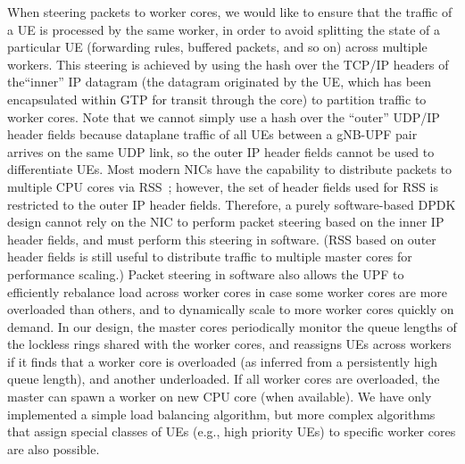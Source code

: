 When steering packets to worker cores, we would like to ensure that the traffic of a UE is processed by the same worker, in order to avoid splitting the state of a particular UE (forwarding rules, buffered packets, and so on) across multiple workers. This steering is achieved by using the hash over the TCP/IP headers of the``inner'' IP datagram (the datagram originated by the UE, which has been encapsulated within GTP for transit through the core) to partition traffic to worker cores. Note that we cannot simply use a hash over the ``outer'' UDP/IP header fields because dataplane traffic of all UEs between a gNB-UPF pair arrives on the same UDP link, so the outer IP header fields cannot be used to differentiate UEs.  Most modern NICs have the capability to distribute packets to multiple CPU cores via RSS~\cite{rss}; however, the set of header fields used for RSS is restricted to the outer IP header fields. Therefore, a purely software-based DPDK design cannot rely on the NIC to perform packet steering based on the inner IP header fields, and must perform this steering in software.  (RSS based on outer header fields is still useful to distribute traffic to multiple master cores for performance scaling.) Packet steering in software also allows the UPF to efficiently rebalance load across worker cores in case some worker cores are more overloaded than others, and to dynamically scale to more worker cores quickly on demand. In our design, the master cores periodically monitor the queue lengths of the lockless rings shared with the worker cores, and reassigns UEs across workers if it finds that a worker core is overloaded (as inferred from a persistently high queue length), and another underloaded. If all worker cores are overloaded, the master can spawn a worker on new CPU core (when available). We have only implemented a simple load balancing algorithm, but more complex algorithms that assign special classes of UEs (e.g., high priority UEs) to specific worker cores are also possible. 


